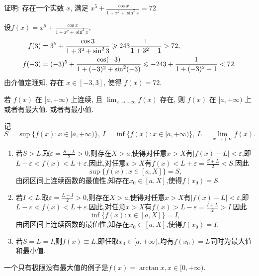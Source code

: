\begin{exercise}[2.C.6]
    证明: 存在一个实数 $x$, 满足 $x^5 + \frac{\cos x}{1+x^2+\sin^2 x} = 72$.
\end{exercise}

\begin{solution}
    设$f(x)=x^5 + \frac{\cos x}{1+x^2+\sin^2 x} ,$
    \begin{align*}
        f(3) &= 3^5 + \frac{\cos 3}{1+3^2+\sin^2 3}  \geqslant 243 \frac{1}{1+3^2-1} > 72,\\
        f(-3) &= (-3)^5 + \frac{\cos (-3)}{1+(-3)^2+\sin^2 (-3)} \leqslant -243 + \frac{1}{1+(-3)^2-1} <72.
    \end{align*}
    由介值定理知, 存在 $x \in [-3,3]$, 使得 $f(x) = 72$.
\end{solution}

\begin{exercise}[2.C.7]
    若 $f(x)$ 在 $[a, +\infty)$ 上连续, 且 $\lim_{x \to +\infty} f(x)$ 存在, 则 $f(x)$ 在 $[a, +\infty)$ 上或者有最大值, 或者有最小值.
\end{exercise}

\begin{solution}
    记$$S = \sup \{ f(x): x \in [a, +\infty) \}, \ I = \inf \{ f(x): x \in [a, +\infty) \}, \ L = \lim_{x \to +\infty} f(x).$$
    \begin{enumerate}
        \item 若$S > L$,取$\varepsilon = \frac{S-L}{2} > 0$,则存在$X > a$,使得对任意$x > X$有$|f(x)-L| < \varepsilon$,即$L - \varepsilon < f(x) < L + \varepsilon$.因此,对任意$x > X$有$f(x) < L + \varepsilon = \frac{S+L}{2} < S$.因此$$\sup \{ f(x): x \in [a, X] \} = S,$$由闭区间上连续函数的最值性,知存在$x_0 \in [a,X]$,使得$f(x_0) = S$.
        \item 若$I < L$,取$\varepsilon = \frac{L-I}{2} > 0$,则存在$X > a$,使得对任意$x > X$有$|f(x)-L| < \varepsilon$,即$L - \varepsilon < f(x) < L + \varepsilon$.因此,对任意$x > X$有$f(x) > L - \varepsilon = \frac{I+L}{2} > I$.因此$$\inf \{ f(x): x \in [a, X] \} = I,$$由闭区间上连续函数的最值性,知存在$x_0 \in [a,X]$,使得$f(x_0) = I$.
        \item 若$S = L = I$,则$f(x) \equiv L$,即任取$x_0 \in [a,+\infty)$,均有$f(x_0) = L$同时为最大值和最小值.
    \end{enumerate}
    \begin{remark}
        一个只有极限没有最大值的例子是$f(x) = \arctan x, x \in [0,+\infty)$.
    \end{remark}
\end{solution}

